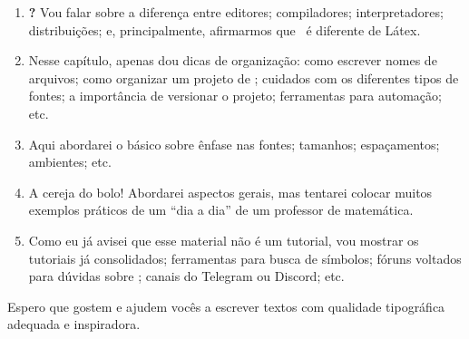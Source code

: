 \begin{enumerate}
  \item {} \textbf{\LaTeXX ?}
        Vou falar sobre a diferença entre editores; compiladores; interpretadores; 
        distribuições; e, principalmente, afirmarmos que \LaTeXX\ é 
        diferente de Látex.
  \item {}
        Nesse capítulo, apenas dou dicas de organização: como escrever nomes de 
        arquivos; como organizar um projeto de \LaTeXX; cuidados com os 
        diferentes tipos de fontes; a importância de versionar o projeto; 
        ferramentas para automação; etc.
  \item {}
        Aqui abordarei o básico sobre ênfase nas fontes; tamanhos; espaçamentos; 
        ambientes; etc.
  \item {}
        A cereja do bolo!
        Abordarei aspectos gerais, mas tentarei colocar muitos exemplos práticos 
        de um ``dia a dia'' de um professor de matemática.
  \item {}
        Como eu já avisei que esse material não é um tutorial, vou mostrar os 
        tutoriais já consolidados; ferramentas para busca de símbolos; fóruns 
        voltados para dúvidas sobre \LaTeXX; canais do Telegram ou Discord; etc.
\end{enumerate}

Espero que gostem e ajudem vocês a escrever textos com qualidade tipográfica 
adequada e inspiradora. 

